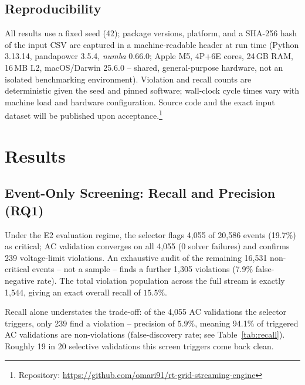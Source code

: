 \documentclass[11pt,conference]{IEEEtran}
\begin{document}
\subsection{Reproducibility}
All results use a fixed seed (42); package versions, platform, and a SHA-256 hash of the input CSV
are captured in a machine-readable header at run time (Python 3.13.14, pandapower 3.5.4,
\textit{numba} 0.66.0; Apple M5, 4P+6E cores, 24\,GB RAM, 16\,MB L2, macOS/Darwin 25.6.0 -- shared,
general-purpose hardware, not an isolated benchmarking environment). Violation and recall counts
are deterministic given the seed and pinned software; wall-clock cycle times vary with machine
load and hardware configuration.
Source code and the exact input dataset will be published upon acceptance.\footnote{Repository:
\url{https://github.com/omari91/rt-grid-streaming-engine}}

\section{Results}
\label{sec:results}

\subsection{Event-Only Screening: Recall and Precision (RQ1)}
\label{sec:screening_result}
Under the E2 evaluation regime, the selector flags 4,055 of 20,586 events (19.7\%) as critical; AC
validation converges on all 4,055 (0 solver failures) and confirms 239 voltage-limit violations. An
exhaustive audit of the remaining 16,531 non-critical events -- not a sample -- finds a further
1,305 violations (7.9\% false-negative rate). The total violation population across the full stream
is exactly 1,544, giving an exact overall recall of $\mathbf{15.5\%}$.

Recall alone understates the trade-off: of the 4,055 AC validations the selector triggers, only 239
find a violation -- precision of $\mathbf{5.9\%}$, meaning 94.1\% of triggered AC validations are
non-violations (false-discovery rate; see Table~\ref{tab:recall}).
Roughly 19 in 20 selective validations this screen triggers come back clean.
\end{document}

